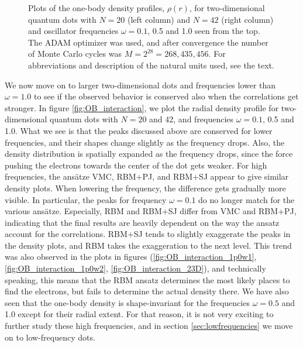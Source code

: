 \begin{figure}
	\caption{Plots of the one-body density profiles, $\rho(r)$, for two-dimensional quantum dots with $N=20$ (left column) and $N=42$ (right column) and oscillator frequencies $\omega=0.1$, 0.5 and 1.0 seen from the top. The ADAM optimizer was used, and after convergence the number of Monte Carlo cycles was $M=2^{28}=268,435,456$. For  abbreviations and description of the natural units used, see the text.}
	\label{fig:OB_interaction}
\end{figure}

We now move on to larger two-dimensional dots and frequencies lower than $\omega=1.0$ to see if the observed behavior is conserved also when the correlations get stronger. In figure \eqref{fig:OB_interaction}, we plot the radial density profile for two-dimensional quantum dots with $N=20$ and 42, and frequencies $\omega=0.1$, 0.5 and 1.0. What we see is that the peaks discussed above are conserved for lower frequencies, and their shapes change slightly as the frequency drops. Also, the density distribution is spatially expanded as the frequency drops, since the force pushing the electrons towards the center of the dot gets weaker. For high frequencies, the ansätze VMC, RBM+PJ, and RBM+SJ appear to give similar density plots. When lowering the frequency, the difference gets gradually more visible. In particular, the peaks for frequency $\omega=0.1$ do no longer match for the various ansätze. Especially, RBM and RBM+SJ differ from VMC and RBM+PJ, indicating that the final results are heavily dependent on the way the ansatz account for the correlations. RBM+SJ tends to slightly exaggerate the peaks in the density plots, and RBM takes the exaggeration to the next level. This trend was also observed in the plots in figures (\ref{fig:OB_interaction_1p0w1}, \ref{fig:OB_interaction_1p0w2}, \ref{fig:OB_interaction_23D}), and technically speaking, this means that the RBM ansatz determines the most likely places to find the electrons, but fails to determine the actual density there. We have also seen that the one-body density is shape-invariant for the frequencies $\omega=0.5$ and 1.0 except for their radial extent. For that reason, it is not very exciting to further study these high frequencies, and in section \ref{sec:lowfrequencies} we move on to low-frequency dots.

